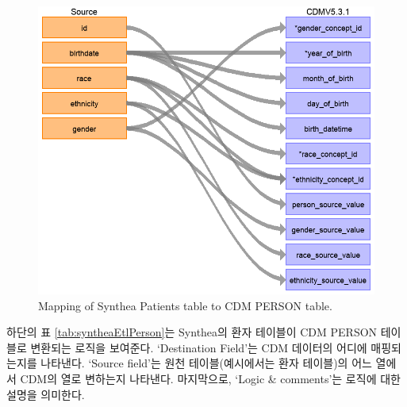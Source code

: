 \documentclass[11pt]{book}
\theoremstyle{definition}
\theoremstyle{definition}
\theoremstyle{definition}
\theoremstyle{remark}
\begin{document}
\begin{figure}

{\centering \includegraphics[width=1\linewidth]{images/ExtractTransformLoad/syntheaPersonTable} 

}

\caption{Mapping of Synthea Patients table to CDM PERSON table.}\label{fig:syntheaPerson}
\end{figure}

하단의 표 \ref{tab:syntheaEtlPerson}는 Synthea의 환자 테이블이 CDM
PERSON 테이블로 변환되는 로직을 보여준다. `Destination Field'는 CDM
데이터의 어디에 매핑되는지를 나타낸다. `Source field'는 원천
테이블(예시에서는 환자 테이블)의 어느 열에서 CDM의 열로 변하는지
나타낸다. 마지막으로, `Logic \& comments'는 로직에 대한 설명을 의미한다.
\end{document}
